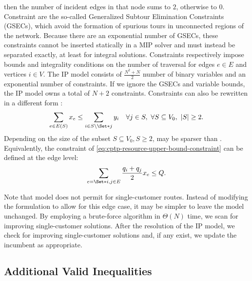 then the number of incident edges in that node sums to $2$, otherwise to $0$.
Constraint 
are the so-called Generalized Subtour Elimination Constraints (GSECs),
which avoid the formation of spurious tours in unconnected regions of the network.
Because there are an exponential number of GSECs,
these constraints cannot be inserted statically in a MIP solver
and must instead be separated exactly, at least for integral solutions.
Constraints  respectively
impose bounds and integrality conditions
on the number of traversal for edges $e \in E$ and vertices $i \in V$.
The IP model consists of $\frac{N^2 + N}{2}$ number of binary variables and an exponential number of constraints.
If we ignore the GSECs and variable bounds, the IP model owns a total of $N + 2$ constraints.
Constraints 
can also be rewritten in a different form \parencite{wolsey2020integer}:
\begin{equation}
	\label{eq:cptp-gsec-constraints-v2}
	\sum\limits_{e \in E(S)} x_e \le \sum\limits_{i \in S \setminus \Set*{j}} y_i \quad \forall j \in S,\ \forall S \subseteq V_0,\ |S| \ge 2.
\end{equation}
Depending on the size of the subset $S \subseteq V_0, S \ge 2$,
 may be sparser than .
Equivalently, the constraint of \cref{eq:cptp-resource-upper-bound-constraint}
can be defined at the edge level:
\begin{equation}
	\label{eq:cptp-resource-upper-bound-constraint-edge-level}
	\sum_{e = \Set*{i, j} \in E} \frac{q_i + q_j}{2} x_e \le Q.
\end{equation}

Note that model
does not permit for single-customer routes.
Instead of modifying the formulation to allow for this edge case,
it may be simpler to leave the model unchanged.
By employing a brute-force algorithm in $\Theta(N)$ time,
we scan for improving single-customer solutions.
After the resolution of the IP model,
we check for improving single-customer solutions and,
if any exist,
we update the incumbent as appropriate.

\subsection{Additional Valid Inequalities}
\label{sec:cptp-additional-valid-inequalities}

